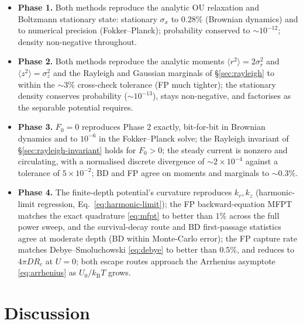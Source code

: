 \documentclass[11pt]{article}
\newcommand{\avg}[1]{\langle #1 \rangle}
\newcommand{\kB}{k_{\mathrm{B}}}
\begin{document}
\begin{itemize}[leftmargin=1.6em]
\item \textbf{Phase 1.} Both methods reproduce the analytic OU relaxation and Boltzmann stationary state: stationary $\sigma_x$ to $0.28\%$ (Brownian dynamics) and to numerical precision (Fokker--Planck); probability conserved to $\sim10^{-12}$; density non-negative throughout.
\item \textbf{Phase 2.} Both methods reproduce the analytic moments $\avg{r^2}=2\sigma_r^2$ and $\avg{z^2}=\sigma_z^2$ and the Rayleigh and Gaussian marginals of \S\ref{sec:rayleigh} to within the $\sim3\%$ cross-check tolerance (FP much tighter); the stationary density conserves probability ($\sim10^{-13}$), stays non-negative, and factorises as the separable potential requires.
\item \textbf{Phase 3.} $F_0=0$ reproduces Phase 2 exactly, bit-for-bit in Brownian dynamics and to $10^{-6}$ in the Fokker--Planck solve; the Rayleigh invariant of \S\ref{sec:rayleigh-invariant} holds for $F_0>0$; the steady current is nonzero and circulating, with a normalised discrete divergence of $\sim2\times10^{-4}$ against a tolerance of $5\times10^{-2}$; BD and FP agree on moments and marginals to $\sim0.3\%$.
\item \textbf{Phase 4.} The finite-depth potential's curvature reproduces $k_r, k_z$ (harmonic-limit regression, Eq.~\eqref{eq:harmonic-limit}); the FP backward-equation MFPT matches the exact quadrature \eqref{eq:mfpt} to better than $1\%$ across the full power sweep, and the survival-decay route and BD first-passage statistics agree at moderate depth (BD within Monte-Carlo error); the FP capture rate matches Debye--Smoluchowski \eqref{eq:debye} to better than $0.5\%$, and reduces to $4\pi D R_c$ at $U=0$; both escape routes approach the Arrhenius asymptote \eqref{eq:arrhenius} as $U_0/\kB T$ grows.
\end{itemize}

\section{Discussion}
\end{document}
